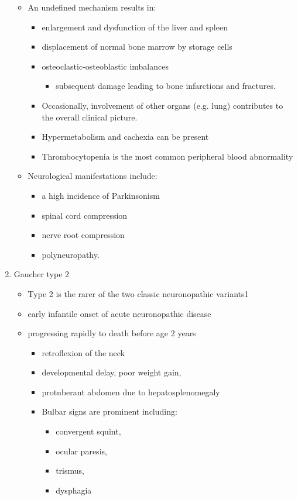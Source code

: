 \documentclass{scrartcl}
\begin{document}
\begin{enumerate}
\begin{itemize}
\item An undefined mechanism results in:
\begin{itemize}
\item enlargement and dysfunction of the liver and spleen
\item displacement of normal bone marrow by storage cells
\item osteoclastic-osteoblastic imbalances
\begin{itemize}
\item subsequent damage leading to bone infarctions and fractures.
\end{itemize}
\item Occasionally, involvement of other organs (e.g. lung) contributes
to the overall clinical picture.
\item Hypermetabolism and cachexia can be present
\item Thrombocytopenia is the most common peripheral blood abnormality
\end{itemize}

\item Neurological manifestations include:
\begin{itemize}
\item a high incidence of Parkinsonism
\item spinal cord compression
\item nerve root compression
\item polyneuropathy.
\end{itemize}
\end{itemize}

\item Gaucher type 2
\label{sec:orgd861109}
\begin{itemize}
\item Type 2 is the rarer of the two classic neuronopathic variants1
\item early infantile onset of acute neuronopathic disease
\item progressing rapidly to death before age 2 years

\begin{itemize}
\item retroflexion of the neck
\item developmental delay, poor weight gain,
\item protuberant abdomen due to hepatosplenomegaly
\item Bulbar signs are prominent including:
\begin{itemize}
\item convergent squint,
\item ocular paresis,
\item trismus,
\item dysphagia
\end{itemize}
\end{itemize}


\end{itemize}
\end{enumerate}
\end{document}
